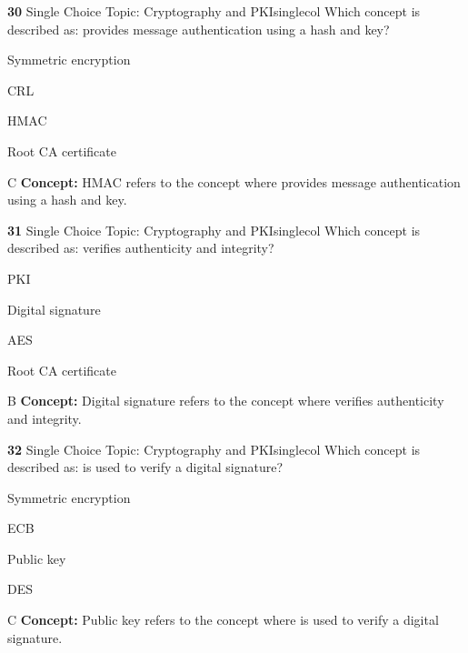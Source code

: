 \documentclass[10pt,a4paper]{article}
\begin{document}
\begin{qcard}{\color{white}\textbf{30} \hfill \small Single Choice \textbar{} Topic: Cryptography and PKI}{singlecol}
Which concept is described as: provides message authentication using a hash and key?

\begin{qoptions}
\item Symmetric encryption
\item CRL
\item HMAC
\item Root CA certificate
\end{qoptions}
\begin{explainbox}{C}
\textbf{Concept:} HMAC refers to the concept where provides message authentication using a hash and key.
\end{explainbox}
\end{qcard}

\begin{qcard}{\color{white}\textbf{31} \hfill \small Single Choice \textbar{} Topic: Cryptography and PKI}{singlecol}
Which concept is described as: verifies authenticity and integrity?

\begin{qoptions}
\item PKI
\item Digital signature
\item AES
\item Root CA certificate
\end{qoptions}
\begin{explainbox}{B}
\textbf{Concept:} Digital signature refers to the concept where verifies authenticity and integrity.
\end{explainbox}
\end{qcard}

\begin{qcard}{\color{white}\textbf{32} \hfill \small Single Choice \textbar{} Topic: Cryptography and PKI}{singlecol}
Which concept is described as: is used to verify a digital signature?

\begin{qoptions}
\item Symmetric encryption
\item ECB
\item Public key
\item DES
\end{qoptions}
\begin{explainbox}{C}
\textbf{Concept:} Public key refers to the concept where is used to verify a digital signature.
\end{explainbox}
\end{qcard}
\end{document}
